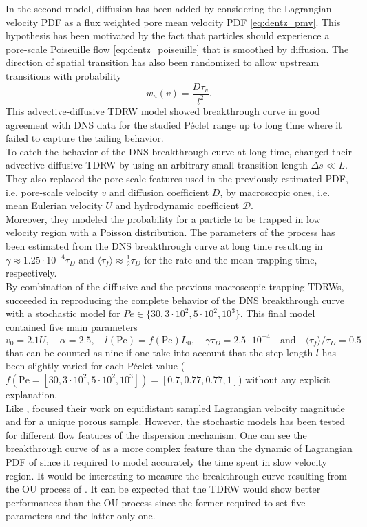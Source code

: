 In the second model, diffusion has been added by considering the Lagrangian velocity PDF as a flux weighted pore mean velocity PDF \eqref{eq:dentz_pmv}. This hypothesis has been motivated by the fact that particles should experience a pore-scale Poiseuille flow \eqref{eq:dentz_poiseuille} that is smoothed by diffusion.
The direction of spatial transition has also been randomized to allow upstream transitions with probability 
\[w_u(v)=\frac{D\tau_v}{l^2}.\]
This advective-diffusive TDRW model showed breakthrough curve in good agreement with DNS data for the studied Péclet range up to long time where it failed to capture the tailing behavior. \\
To catch the behavior of the DNS breakthrough curve at long time, \citeauthor{Dentz2017} changed their advective-diffusive TDRW by using an arbitrary small transition length $\Delta s\ll L$. 
They also replaced the pore-scale features used in the previously estimated PDF, i.e. pore-scale velocity $v$ and diffusion coefficient $D$, by macroscopic ones, i.e. mean Eulerian velocity $U$ and hydrodynamic coefficient $\mathcal{D}$.\\
Moreover, they modeled the probability for a particle to be trapped in low velocity region with a Poisson distribution. 
The parameters of the process has been estimated from the DNS breakthrough curve at long time resulting in $\gamma\approx1.25\cdot10^{-4}\tau_D$ and $\langle\tau_f\rangle\approx\frac{1}{2}\tau_D$ for the rate and the mean trapping time, respectively.\\
By combination of the diffusive and the previous macroscopic trapping TDRWs, \citeauthor{Dentz2017} succeeded in reproducing the complete behavior of the DNS breakthrough curve with a stochastic model for $Pe\in\{30, 3\cdot10^2, 5\cdot10^2, 10^3\}$. This final model contained five main parameters  
\[v_0=2.1U,\quad\alpha=2.5,\quad l(\mathrm{Pe})=f(\mathrm{Pe})L_0,\quad\gamma\tau_D=2.5\cdot 10^{-4}\quad\textrm{and}\quad\langle\tau_f\rangle/\tau_D=0.5\]
that can be counted as nine if one take into account that the step length $l$ has been slightly varied for each Péclet value ($f(\mathrm{Pe}=[30, 3\cdot10^2, 5\cdot10^2, 10^3])=[0.7,0.77,0.77,1]$) without any explicit explanation.\\
Like \citeauthor{Puyguiraud2019}, \citeauthor{Dentz2017} focused their work on equidistant sampled Lagrangian velocity magnitude and for a unique porous sample. However, the stochastic models has been tested for different flow features of the dispersion mechanism. 
One can see the breakthrough curve of \citeauthor{Dentz2017} as a more complex feature than the dynamic of Lagrangian PDF of \citeauthor{Puyguiraud2019} since it required to model accurately the time spent in slow velocity region.
It would be interesting to measure the breakthrough curve resulting from the OU process of \citet{Puyguiraud2019}.
It can be expected that the TDRW would show better performances than the OU process since the former required to set five parameters and the latter only one.

